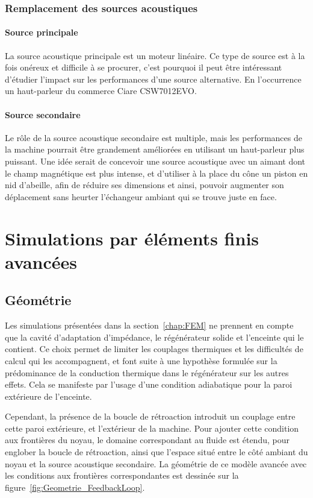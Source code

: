 \subsubsection{Remplacement des sources acoustiques}
\paragraph{Source principale}
La source acoustique principale est un moteur linéaire. Ce type de source est à la fois onéreux et difficile à se procurer, c'est pourquoi il peut être intéressant d'étudier l'impact sur les performances d'une source alternative. En l'occurrence un haut-parleur du commerce Ciare CSW7012EVO. 

\paragraph{Source secondaire}
Le rôle de la source acoustique secondaire est multiple, mais les performances de la machine pourrait être grandement améliorées en utilisant un haut-parleur plus puissant. Une idée serait de concevoir une source acoustique avec un aimant dont le champ magnétique est plus intense, et d'utiliser à la place du cône un piston en nid d'abeille, afin de réduire ses dimensions et ainsi, pouvoir augmenter son déplacement sans heurter l'échangeur ambiant qui se trouve juste en face.

\section{Simulations par éléments finis avancées}
\subsection{Géométrie}
Les simulations présentées dans la section~\ref{chap:FEM} ne prennent en compte que la cavité d'adaptation d'impédance, le régénérateur solide et l'enceinte qui le contient. Ce choix permet de limiter les couplages thermiques et les difficultés de calcul qui les accompagnent, et font suite à une hypothèse formulée sur la prédominance de la conduction thermique dans le régénérateur sur les autres effets. Cela se manifeste par l'usage d'une condition adiabatique pour la paroi extérieure de l'enceinte. 

Cependant, la présence de la boucle de rétroaction introduit un couplage entre cette paroi extérieure, et l'extérieur de la machine. Pour ajouter cette condition aux frontières du noyau, le domaine correspondant au fluide est étendu, pour englober la boucle de rétroaction, ainsi que l'espace situé entre le côté ambiant du noyau et la source acoustique secondaire. La géométrie de ce modèle avancée avec les conditions aux frontières correspondantes est dessinée sur la figure~\ref{fig:Geometrie_FeedbackLoop}.

